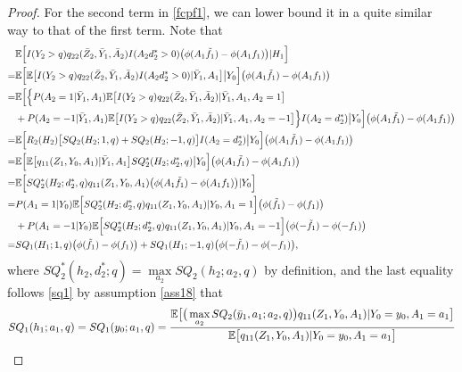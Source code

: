 \documentclass[10pt]{article}
\theoremstyle{remark} \newtheorem{rem}{Remark}
\begin{document}
\begin{proof}
    For the second term in \eqref{fcpf1}, we can lower bound it in a quite similar way to that of the first term. 
    Note that 
    \begin{align}
        &\mathbb{E}\Big[I(Y_2>q)q_{22}(\bar Z_{2}, \bar Y_{1}, \bar A_{2})I(A_2d_2^*>0)\big(\phi(A_1\tilde f_1)-\phi(A_1f_1)\big)|H_1\Big] \notag\\
        =& \mathbb{E}\Big[\mathbb{E}\big[I(Y_2>q)q_{22}(\bar Z_{2}, \bar Y_{1}, \bar A_{2})I(A_2d_2^*>0)|\bar Y_1,A_1\big]\big|Y_0\Big]\big(\phi(A_1\tilde f_1)-\phi(A_1f_1)\big) \notag\\
        =& \mathbb{E}\Big[\Big\{P(A_2=1|\bar Y_1,A_1)\mathbb{E}\big[I(Y_2>q)q_{22}(\bar Z_{2}, \bar Y_{1}, \bar A_{2})|\bar Y_1,A_1,A_2=1\big] \notag\\
        &+ P(A_2=-1|\bar Y_1,A_1)\mathbb{E}\big[I(Y_2>q)q_{22}(\bar Z_{2}, \bar Y_{1}, \bar A_{2})|\bar Y_1,A_1,A_2=-1\big]\Big\}I(A_2=d_2^*)\big|Y_0\Big]\big(\phi(A_1\tilde f_1)-\phi(A_1f_1)\big) \notag\\
        =& \mathbb{E}\Big[R_2(H_2)\big[SQ_2(H_2;1,q)+SQ_2(H_2;-1,q)\big]I(A_2=d_2^*) \big|Y_0\Big]\big(\phi(A_1\tilde f_1)-\phi(A_1f_1)\big) \notag\\
        =& \mathbb{E}\Big[\mathbb{E}\big[q_{11}(Z_1,Y_0,A_1)|\bar Y_1,A_1\big]SQ_2^*(H_2;d_2^*,q)\big|Y_0\Big]\big(\phi(A_1\tilde f_1)-\phi(A_1f_1)\big) \notag\\
        =& \mathbb{E}\Big[SQ_2^*(H_2;d_2^*,q)q_{11}(Z_1,Y_0,A_1)\big(\phi(A_1\tilde f_1)-\phi(A_1f_1)\big)|Y_0\Big] \notag\\
        =& P(A_1=1|Y_0)\mathbb{E}\Big[SQ_2^*(H_2;d_2^*,q)q_{11}(Z_1,Y_0,A_1)|Y_0,A_1=1\Big]\big(\phi(\tilde f_1)-\phi(f_1)\big) \notag\\
        &+ P(A_1=-1|Y_0)\mathbb{E}\Big[SQ_2^*(H_2;d_2^*,q)q_{11}(Z_1,Y_0,A_1)|Y_0,A_1=-1\Big]\big(\phi(-\tilde f_1)-\phi(-f_1)\big) \notag\\
        =& SQ_1(H_1;1,q)\big(\phi(\tilde f_1)-\phi(f_1)\big) + SQ_1(H_1;-1,q)\big(\phi(-\tilde f_1)-\phi(-f_1)\big),
    \end{align}
    where $SQ_2^*(h_2,d_2^*;q) = \max\limits_{a_2}SQ_2(h_2;a_2,q)$ by definition,
    and the last equality follows \eqref{sq1} by assumption \ref{ass18} that 
    \begin{align*}
        SQ_1(h_1;a_1,q) = SQ_1(y_0;a_1,q) &= \frac{\mathbb{E}\big[\big(\max\limits_{a_2}SQ_2(\bar y_1,a_1;a_2,q)\big)q_{11}(Z_1, Y_0, A_1)|Y_0= y_0, A_1= a_1\big]}{\mathbb{E}\big[q_{11}(Z_1, Y_0, A_1)|Y_0= y_0, A_1= a_1\big]} \notag\\

\end{align*}
\end{proof}
\end{document}
